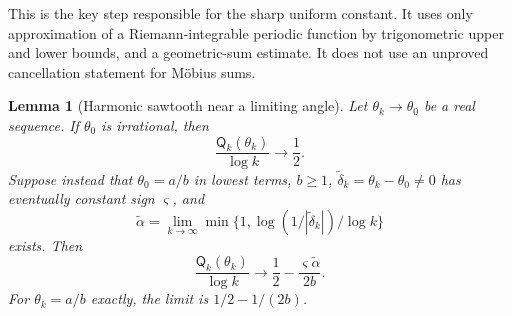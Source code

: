 \documentclass[11pt]{article}
\numberwithin{equation}{section}
\newtheorem{lemma}[theorem]{Lemma}
\theoremstyle{definition}
\theoremstyle{remark}
\begin{document}
This is the key step responsible for the sharp uniform constant. It uses
only approximation of a Riemann-integrable periodic function by
trigonometric upper and lower bounds, and a geometric-sum estimate. It
does not use an unproved cancellation statement for M\"obius sums.

\begin{lemma}[Harmonic sawtooth near a limiting angle]\label{mxc:hz:ar:lem:saw}
Let $\theta_k\to\theta_0$ be a real sequence. If $\theta_0$ is irrational,
then
\[
 \frac{\mathsf Q_k(\theta_k)}{\log k}\longrightarrow\frac12.
\]
Suppose instead that $\theta_0=a/b$ in lowest terms, $b\ge1$,
$\widetilde\delta_k=\theta_k-\theta_0\ne0$ has eventually constant sign
$\varsigma$, and
\[
 \widetilde\alpha=\lim_{k\to\infty}
 \min\{1,\log(1/|\widetilde\delta_k|)/\log k\}
\]
exists. Then
\begin{equation}\label{mxc:hz:ar:eq:sawlimit}
 \frac{\mathsf Q_k(\theta_k)}{\log k}
 \longrightarrow\frac12-\frac{\varsigma\widetilde\alpha}{2b}.
\end{equation}
For $\theta_k=a/b$ exactly, the limit is $1/2-1/(2b)$.
\end{lemma}
\end{document}
